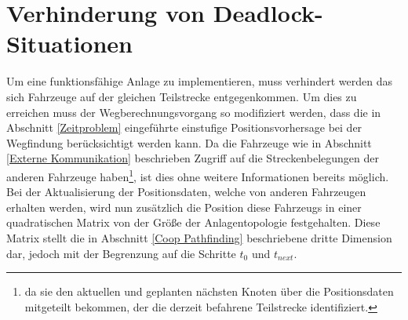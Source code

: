 \section{Verhinderung von Deadlock-Situationen}
	Um eine funktionsfähige Anlage zu implementieren, muss verhindert werden das sich Fahrzeuge auf der gleichen Teilstrecke entgegenkommen. Um dies zu erreichen muss der Wegberechnungsvorgang so modifiziert werden, dass die in Abschnitt \ref{Zeitproblem} eingeführte einstufige Positionsvorhersage bei der Wegfindung berücksichtigt werden kann. Da die Fahrzeuge wie in Abschnitt \ref{Externe Kommunikation} beschrieben Zugriff auf die Streckenbelegungen der anderen Fahrzeuge haben\footnote{da sie den aktuellen und geplanten nächsten Knoten über die Positionsdaten mitgeteilt bekommen, der die derzeit befahrene Teilstrecke identifiziert.}, ist dies ohne weitere Informationen bereits möglich. Bei der Aktualisierung der Positionsdaten, welche von anderen Fahrzeugen erhalten werden, wird nun zusätzlich die Position diese Fahrzeugs in einer quadratischen Matrix von der Größe der Anlagentopologie festgehalten. Diese Matrix stellt die in Abschnitt \ref{Coop Pathfinding} beschriebene dritte Dimension dar, jedoch mit der Begrenzung auf die Schritte $t_0$ und $t_{next}$.

